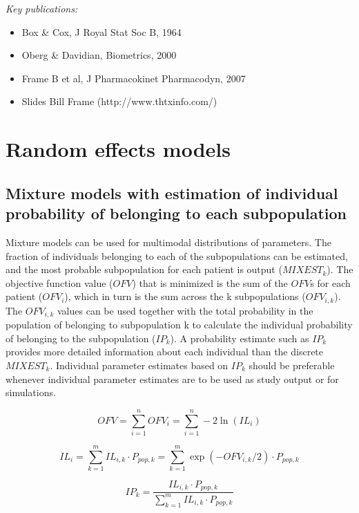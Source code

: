 \documentclass[a4paper,11pt]{article}
\begin{document}
\noindent \emph{Key publications:}
\begin{itemize}
\item Box \& Cox, J Royal Stat Soc B, 1964
\item Oberg \& Davidian, Biometrics, 2000
\item Frame B et al, J Pharmacokinet Pharmacodyn, 2007
\item Slides Bill Frame (http://www.thtxinfo.com/)
\end{itemize}


\section{Random effects models}

\subsection{Mixture models with estimation of individual probability of belonging to each subpopulation}
Mixture models can be used for multimodal distributions of
parameters. The fraction of individuals belonging to each of the
subpopulations can be estimated, and the most probable subpopulation
for each patient is output ($MIXEST_k$). The objective function value
($OFV$) that is minimized is the sum of the $OFV$s for each patient
($OFV_i$), which in turn is the sum across the k subpopulations
($OFV_{i,k}$). The $OFV_{i,k}$ values can be used together with the
total probability in the population of belonging to subpopulation k to
calculate the individual probability of belonging to the subpopulation
($IP_k$). A probability estimate such as $IP_k$ provides more detailed
information about each individual than the discrete
$MIXEST_k$. Individual parameter estimates based on $IP_k$ should be
preferable whenever individual parameter estimates are to be used as
study output or for simulations. 

\begin{equation}
OFV = \displaystyle\sum\limits_{i=1}^n OFV_i = \displaystyle\sum\limits_{i=1}^n -2 \ln(IL_i)
\end{equation}

\begin{equation}
IL_i = \displaystyle\sum\limits_{k=1}^m IL_{i,k} \cdot P_{pop,k} = \displaystyle\sum\limits_{k=1}^m \exp(-OFV_{i,k} / 2) \cdot P_{pop,k} 
\end{equation}

\begin{equation}
IP_k = \frac{IL_{i,k} \cdot P_{pop,k}}{\displaystyle\sum\limits_{k=1}^m IL_{i,k} \cdot P_{pop,k}}
\end{equation}
\end{document}
